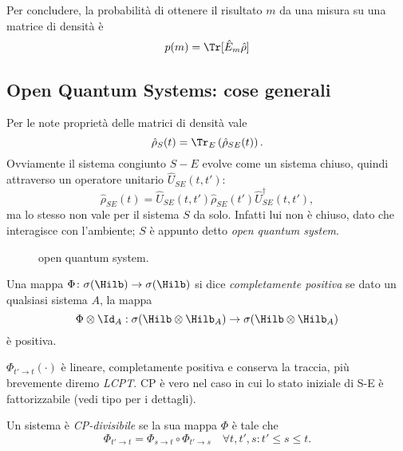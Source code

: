 \documentclass[a4]{article}
\begin{document}
Per concludere, la probabilità di ottenere il risultato \(m\) da una misura su
una matrice di densità è
\[p(m) = \Tr[\hat{E}_m \hat{\rho}]\]



\subsection{Open Quantum Systems: cose generali}
Per le note proprietà delle matrici di densità vale 
\[\hat{\rho}_S(t) = \Tr_E\left(\hat{\rho}_{SE}(t)\right).\]
Ovviamente il sistema congiunto \(S-E\) evolve come un sistema chiuso, quindi attraverso un
operatore unitario \(\hat{U}_{SE}(t, t')\):
\[\hat{\rho}_{SE}(t) = \hat{U}_{SE}(t, t') \hat{\rho}_{SE}(t') \hat{U}^{\dag}_{SE}(t, t'),\]
ma lo stesso non vale per il sistema \(S\) da solo. Infatti lui non è chiuso, dato che interagisce
con l'ambiente; \(S\) è appunto detto \emph{open quantum system}.
\begin{figure}[h!]
	\centering
	\resizebox{0.5\textwidth}{!}{}
	\caption{open  quantum system.}
\end{figure}
\begin{defn} Una mappa \(\Phi\colon \sigma(\Hilb) \to \sigma(\Hilb) \)
si dice \emph{completamente positiva} se dato un qualsiasi sistema \(A\), la mappa
\[\Phi \otimes \Id_A: \sigma(\Hilb \otimes \Hilb_A) \to \sigma(\Hilb \otimes \Hilb_A) \]
è positiva.
\end{defn}

\(\Phi_{t'\to t}(\cdot)\) è lineare, completamente positiva e conserva la traccia,
più brevemente  diremo \emph{LCPT}. CP è vero nel caso in cui lo stato iniziale di
S-E è fattorizzabile (vedi tipo \cite{breuer2007theory} per i dettagli).

\begin{defn} Un sistema è \emph{CP-divisibile} se la sua
mappa \(\Phi\) è tale che
\begin{equation} \label{eq:CPdiv}
\Phi_{t'\to t} = \Phi_{s\to t} \circ \Phi_{t'\to s} \quad \forall t, t', s: t' \le s \le t.
\end{equation}
\end{defn}
\end{document}
